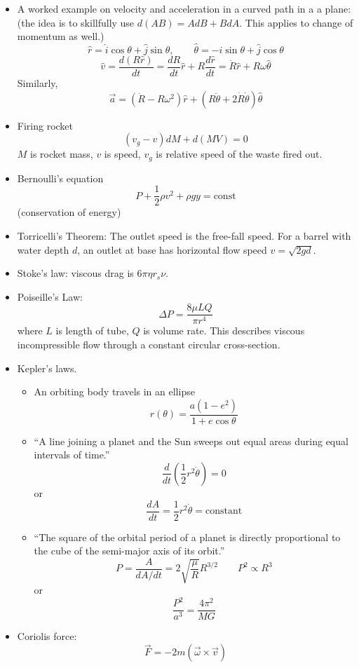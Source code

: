 \begin{itemize}
\item A worked example on velocity and acceleration in a curved path in
a a plane: (the idea is to skillfully use $d(AB)=AdB+BdA$. This applies
to change of momentum as well.)\[
\hat{r}=\hat{i}\cos\theta+\hat{j}\sin\theta,\qquad\hat{\theta}=-\hat{i}\sin\theta+\hat{j}\cos\theta\]
\[
\hat{v}=\frac{d(R\hat{r})}{dt}=\frac{dR}{dt}\hat{r}+R\frac{d\hat{r}}{dt}=\dot{R}\hat{r}+R\omega\hat{\theta}\]
Similarly, \[
\vec{a}=(\ddot{R}-R\omega^{2})\hat{r}+(R\ddot{\theta}+2\dot{R}\dot{\theta})\hat{\theta}\]

\item Firing rocket\[
(v_{g}-v)dM+d(MV)=0\]
$M$ is rocket mass, $v$ is speed, $v_{g}$ is relative speed of
the waste fired out.
\item Bernoulli's equation\[
P+\frac{1}{2}\rho v^{2}+\rho gy=\text{const}\]
(conservation of energy)
\item Torricelli's Theorem: The outlet speed is the free-fall speed. For
a barrel with water depth $d$, an outlet at base has horizontal flow
speed $v=\sqrt{2gd}$.
\item Stoke's law: viscous drag is $6\pi\eta r_{s}\nu$.
\item Poiseille's Law:\[
\Delta P=\frac{8\mu LQ}{\pi r^{4}}\]
where $L$ is length of tube, $Q$ is volume rate. This describes
viscous incompressible flow through a constant circular cross-section.
\item Kepler's laws.

\begin{itemize}
\item An orbiting body travels in an ellipse\[
r(\theta)=\frac{a(1-e^{2})}{1+e\cos\theta}\]

\item {}``A line joining a planet and the Sun sweeps out equal areas during
equal intervals of time.''\[
\frac{d}{dt}\left(\frac{1}{2}r^{2}\dot{\theta}\right)=0\]
or\[
\frac{dA}{dt}=\frac{1}{2}r^{2}\dot{\theta}=\text{constant}\]

\item {}``The square of the orbital period of a planet is directly proportional
to the cube of the semi-major axis of its orbit.''\[
P=\frac{A}{dA/dt}=2\sqrt{\frac{\mu}{R}}R^{3/2}\qquad P^{2}\propto R^{3}\]
or \[
\frac{P^{2}}{a^{3}}=\frac{4\pi^{2}}{MG}\]

\end{itemize}
\item Coriolis force:\[
\vec{F}=-2m(\vec{\omega}\times\vec{v})\]


\end{itemize}
